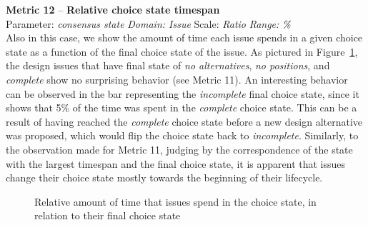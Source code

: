 \documentclass[article]{elsarticle}
\begin{document}
\vspace{1em}
\noindent
\textbf{Metric 12} -- \textbf{Relative choice state timespan}\\
Parameter: \emph{consensus state} \emph{Domain: Issue} Scale: \emph{Ratio} \emph{Range: \%}\\

Also in this case, we show the amount of time each issue spends in a given choice state as a function of the final choice state of the issue.
As pictured in Figure~\ref{fig:M12}, the design issues that have final state of \emph{no alternatives}, \emph{no positions}, and \emph{complete} show no surprising behavior (see Metric 11). An interesting behavior can be observed in the bar representing the \emph{incomplete} final choice state, since it shows that 5\% of the time was spent in the \emph{complete} choice state. This can be a result of having reached the \emph{complete} choice state before a new design alternative was proposed, which would flip the choice state back to \emph{incomplete}. Similarly, to the observation made for Metric 11, judging by the correspondence of the state with the largest timespan and the final choice state, it is apparent that issues change their choice state mostly towards the beginning of their lifecycle. 
\begin{figure}
  \begin{center}

  \caption{Relative amount of time that issues spend in the choice state, in relation to their final  choice state}
  \label{fig:M12}
  \end{center}
\end{figure}
\end{document}
